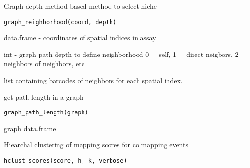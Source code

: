 \documentclass[a4paper]{book}
\begin{document}
%
\begin{Description}
Graph depth method based method to select niche
\end{Description}
%
\begin{Usage}
\begin{verbatim}
graph_neighborhood(coord, depth)
\end{verbatim}
\end{Usage}
%
\begin{Arguments}
\begin{ldescription}
\item[\code{coord}] data.frame - coordinates of spatial indices in assay

\item[\code{depth}] int - graph path depth to define neighborhood 
0 = self, 1 = direct neigbors, 2 = neighbors of neighbors, etc
\end{ldescription}
\end{Arguments}
%
\begin{Value}
list containing barcodes of  neighbors for each 
spatial index.
\end{Value}
%
\begin{Description}
get path length in a graph
\end{Description}
%
\begin{Usage}
\begin{verbatim}
graph_path_length(graph)
\end{verbatim}
\end{Usage}
%
\begin{Arguments}
\begin{ldescription}
\item[\code{graph}] graph data.frame
\end{ldescription}
\end{Arguments}
%
\begin{Description}
Hiearchal clustering of mapping scores for co mapping events
\end{Description}
%
\begin{Usage}
\begin{verbatim}
hclust_scores(score, h, k, verbose)
\end{verbatim}
\end{Usage}
%
\end{document}
